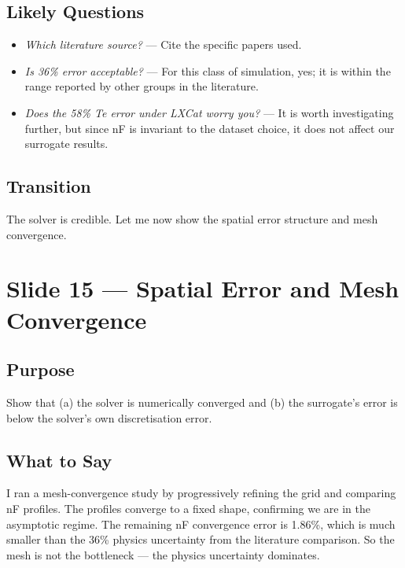 \documentclass[12pt,a4paper]{article}
\begin{document}
\subsection*{Likely Questions}
\begin{itemize}
  \item \emph{Which literature source?}
    --- Cite the specific papers used.
  \item \emph{Is 36\% error acceptable?}
    --- For this class of simulation, yes; it is within the range
    reported by other groups in the literature.
  \item \emph{Does the 58\% Te error under LXCat worry you?}
    --- It is worth investigating further, but since nF is invariant
    to the dataset choice, it does not affect our surrogate results.
\end{itemize}

\subsection*{Transition}
The solver is credible. Let me now show the spatial error structure
and mesh convergence.

\clearpage

\section{Slide 15 --- Spatial Error and Mesh Convergence}
\label{sec:slide15}

\subsection*{Purpose}
Show that (a) the solver is numerically converged and (b) the
surrogate's error is below the solver's own discretisation error.

\subsection*{What to Say}

I ran a mesh-convergence study by progressively refining the grid
and comparing nF profiles. The profiles converge to a fixed shape,
confirming we are in the asymptotic regime. The remaining nF
convergence error is 1.86\%, which is much smaller than the 36\%
physics uncertainty from the literature comparison. So the mesh is
not the bottleneck --- the physics uncertainty dominates.
\end{document}
